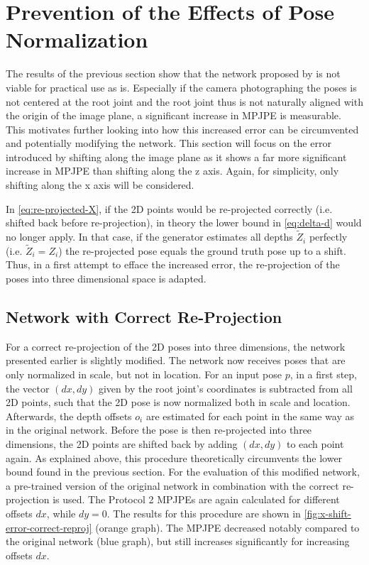 \section{Prevention of the Effects of Pose Normalization}
\label{sec:network-adjusting}

The results of the previous section show that the network proposed by \citet{drover18} is not viable for practical use as is.
Especially if the camera photographing the poses is not centered at the root joint and the root joint thus is not naturally aligned with the origin of the image plane, a significant increase in MPJPE is measurable.
This motivates further looking into how this increased error can be circumvented and potentially modifying the network.
This section will focus on the error introduced by shifting along the image plane as it shows a far more significant increase in MPJPE than shifting along the z axis.
Again, for simplicity, only shifting along the x axis will be considered.

In \autoref{eq:re-projected-X}, if the 2D points would be re-projected correctly (i.e. shifted back before re-projection), in theory the lower bound in \autoref{eq:delta-d} would no longer apply.
In that case, if the generator estimates all depths $\widetilde{Z}_i$ perfectly (i.e. $\widetilde{Z}_i = Z_i$) the re-projected pose equals the ground truth pose up to a shift.
Thus, in a first attempt to efface the increased error, the re-projection of the poses into three dimensional space is adapted.

\subsection{Network with Correct Re-Projection}

For a correct re-projection of the 2D poses into three dimensions, the network presented earlier is slightly modified.
The network now receives poses that are only normalized in scale, but not in location.
For an input pose $p$, in a first step, the vector $(dx, dy)$ given by the root joint's coordinates is subtracted from all 2D points, such that the 2D pose is now normalized both in scale and location.
Afterwards, the depth offsets $o_i$ are estimated for each point in the same way as in the original network.
Before the pose is then re-projected into three dimensions, the 2D points are shifted back by adding $(dx, dy)$ to each point again.
As explained above, this procedure theoretically circumvents the lower bound found in the previous section.
For the evaluation of this modified network, a pre-trained version of the original network in combination with the correct re-projection is used.
The Protocol 2 MPJPEs are again calculated for different offsets $dx$, while $dy = 0$.
The results for this procedure are shown in \autoref{fig:x-shift-error-correct-reproj} (orange graph).
The MPJPE decreased notably compared to the original network (blue graph), but still increases significantly for increasing offsets $dx$.

